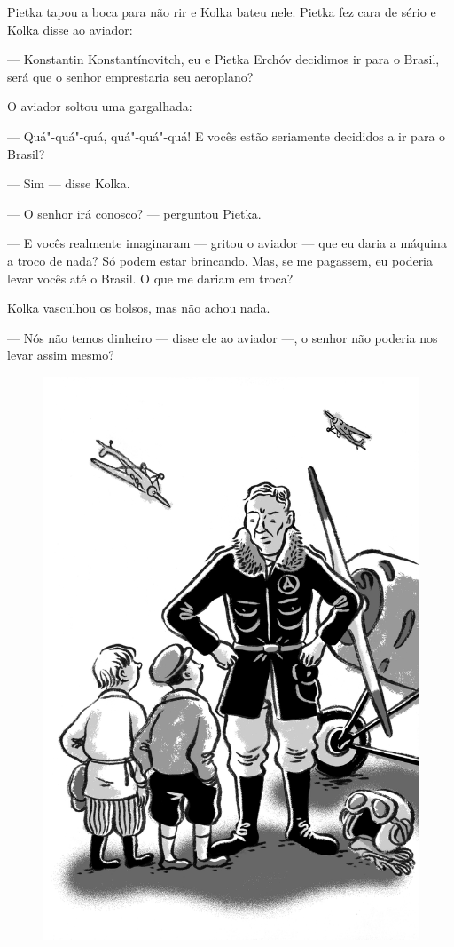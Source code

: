 Pietka tapou a boca para não rir e Kolka bateu nele. Pietka fez cara de
sério e Kolka disse ao aviador:

--- Konstantin Konstantínovitch, eu e Pietka Erchóv decidimos ir para o
Brasil, será que o senhor emprestaria seu aeroplano?

O aviador soltou uma gargalhada:

--- Quá"-quá"-quá, quá"-quá"-quá! E vocês estão seriamente decididos a ir
para o Brasil?

--- Sim --- disse Kolka.

--- O senhor irá conosco? --- perguntou Pietka.

--- E vocês realmente imaginaram --- gritou o aviador --- que eu daria a
máquina a troco de nada? Só podem estar brincando. Mas, se me pagassem,
eu poderia levar vocês até o Brasil. O que me dariam em troca?

Kolka vasculhou os bolsos, mas não achou nada.

--- Nós não temos dinheiro --- disse ele ao aviador ---, o senhor não
poderia nos levar assim mesmo?

\begin{figure}%
\vspace*{-1.6cm}
\hspace*{-2.4cm}\includegraphics{./imgs/cena15.jpg}
\end{figure}

